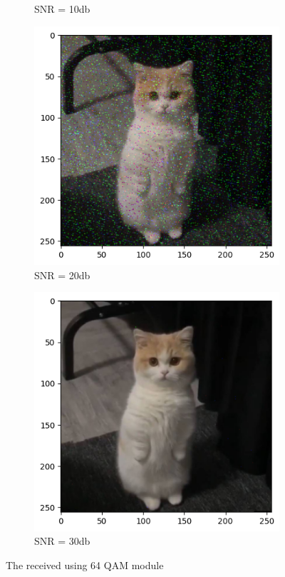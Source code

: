 \begin{figure}[htbp]
\begin{subfigure}[t]{0.49\linewidth}
        \caption{SNR = 10db}
        \label{10db}
    \end{subfigure}
    \hfil
    \begin{subfigure}[t]{0.49\linewidth}
        \includegraphics[width=\linewidth]{../Source/results/output_20db.png}
        \caption{SNR = 20db}
        \label{20db}
    \end{subfigure}
    \hfil
    \begin{subfigure}[t]{0.49\linewidth}
        \includegraphics[width=\linewidth]{../Source/results/output_30db.png}
        \caption{SNR = 30db}
        \label{30db}
    \end{subfigure}
    \caption{The received using 64 QAM module}
    \label{output}
\end{figure}

